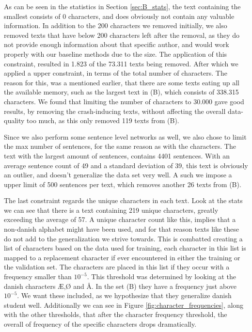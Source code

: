 As can be seen in the statistics in Section \ref{sec:B_stats}, the text
containing the smallest consists of 0 characters, and does obviously not
contain any valuable information. In addition to the 200 characters we removed
initially, we also removed texts that have below 200 characters left after
the removal, as they do not provide enough information about that specific
author, and would work properly with our baseline methods due to the size. The
application of this constraint, resulted in 1.823 of the 73.311 texts being
removed. After which we applied a upper constraint, in terms of the total number
of characters. The reason for this, was a mentioned earlier, that there are some
texts eating up all the available memory, such as the largest text in (B), which
consists of 338.315 characters. We found that limiting the number of characters
to 30.000 gave good results, by removing the crash-inducing texts, without
affecting the overall data-quality too much, as this only removed 119 texts from
(B).

Since we also perform some sentence level networks as well, we also chose to
limit the max number of sentences, for the same reason as with the characters.
The text with the largest amount of sentences, contains 4401 sentences. With
an average sentence count of 49 and a standard deviation of 39, this text is
obviously an outlier, and doesn't generalize the data set very well. A such we
impose a upper limit of 500 sentences per text, which removes another 26 texts
from (B).

The last constraint regards the unique characters in each text. Look at the
stats we can see that there is a text containing 219 unique characters, greatly
exceeding the average of 57. A unique character count like this, implies that a
non-danish alphabet might have been used, and for that reason texts like these
do not add to the generalization we strive towards. This is combatted creating a
list of characters based on the data used for training, each character in this
list is mapped to a replacement character if ever encountered in either the
training or the validation set. The characters are placed in this list if they
occur with a frequency smaller than $10^{-5}$. This threshold was determined
by looking at the danish characters Æ,Ø and Å. In the set (B) they have
a frequency just above $10^{-5}$. We want these included, as we hypothesize
that they generalize danish student well. Additionally we can see in Figure
\ref{fig:character_frequencies}, along with the other thresholds, that after
the character frequency threshold, the overall of frequency of the specific
characters drops dramatically.

